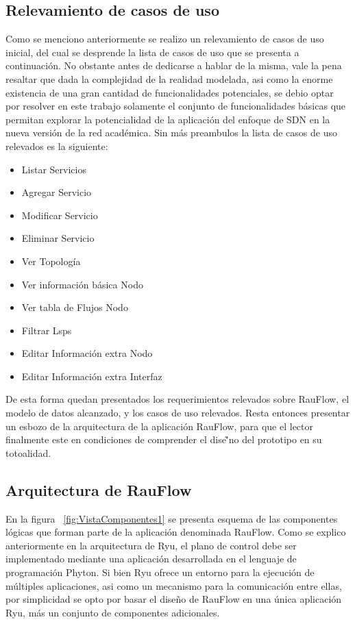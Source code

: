 \newpage
\subsection[Relevamiento de casos de uso]{Relevamiento de casos de uso}

Como se menciono anteriormente se realizo un relevamiento de casos de uso inicial, del cual se desprende la lista de casos de uso que se presenta a continuaci\'on. No obstante antes de dedicarse a hablar de la misma, vale la pena resaltar que dada la complejidad de la realidad modelada, asi como la enorme existencia de una gran cantidad de funcionalidades potenciales, se debio optar por resolver en este trabajo solamente el conjunto de funcionalidades b\'asicas que permitan explorar la potencialidad de la aplicaci\'on del enfoque de SDN en la nueva versi\'on de la red acad\'emica. Sin m\'as preambulos la lista de casos de uso relevados es la siguiente:

\begin{itemize}
\item Listar Servicios
\item Agregar Servicio
\item Modificar Servicio
\item Eliminar Servicio
\item Ver Topolog\'ia
\item Ver informaci\'on b\'asica Nodo
\item Ver tabla de Flujos Nodo
\item Filtrar Lsps
\item Editar Informaci\'on extra Nodo
\item Editar Informaci\'on extra Interfaz
\end{itemize}

De esta forma quedan presentados los requerimientos relevados sobre RauFlow, el modelo de datos alcanzado, y los casos de uso relevados. Resta entonces presentar un esbozo de la arquitectura de la aplicaci\'on RauFlow, para que el lector finalmente este en condiciones de comprender el dise\~'no del prototipo en su totoalidad.

\newpage
\subsection[Arquitectura de RauFlow]{Arquitectura de RauFlow}

En la figura ~\ref{fig:VistaComponentes1} se presenta esquema de las componentes l\'ogicas que forman parte de la aplicaci\'on denominada RauFlow. Como se explico anteriormente en la arquitectura de Ryu, el plano de control debe ser implementado mediante una aplicaci\'on desarrollada en el lenguaje de programaci\'on Phyton. Si bien Ryu ofrece un entorno para la ejecuci\'on de m\'ultiples aplicaciones, asi como un mecanismo para la comunicaci\'on entre ellas, por simplicidad se opto por basar el dise\~no de RauFlow en una \'unica aplicaci\'on Ryu, m\'as un conjunto de componentes adicionales.\\

